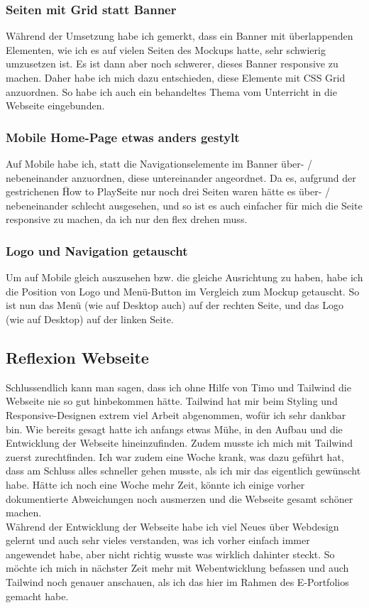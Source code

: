 \documentclass[11pt]{article}
\begin{document}
    \subsubsection{Seiten mit Grid statt Banner}
    Während der Umsetzung habe ich gemerkt, dass ein Banner mit überlappenden Elementen, wie ich es auf vielen Seiten des Mockups hatte, sehr
    schwierig umzusetzen ist. Es ist dann aber noch schwerer, dieses Banner responsive zu machen. Daher habe ich mich dazu entschieden,
    diese Elemente mit CSS Grid anzuordnen. So habe ich auch ein behandeltes Thema vom Unterricht in die Webseite eingebunden.

    \subsubsection{Mobile Home-Page etwas anders gestylt}
    Auf Mobile habe ich, statt die Navigationselemente im Banner über- / nebeneinander anzuordnen, diese untereinander angeordnet. Da es, aufgrund
    der gestrichenen \"How to Play\" Seite nur noch drei Seiten waren hätte es über- / nebeneinander schlecht ausgesehen, und so ist es auch
    einfacher für mich die Seite responsive zu machen, da ich nur den flex drehen muss.

    \subsubsection{Logo und Navigation getauscht}
    Um auf Mobile gleich auszusehen bzw. die gleiche Ausrichtung zu haben, habe ich die Position von Logo und Menü-Button im Vergleich zum Mockup
    getauscht. So ist nun das Menü (wie auf Desktop auch) auf der rechten Seite, und das Logo (wie auf Desktop) auf der linken Seite.

    \subsection{Reflexion Webseite}
    Schlussendlich kann man sagen, dass ich ohne Hilfe von Timo und Tailwind die Webseite nie so gut hinbekommen hätte. Tailwind hat mir
    beim Styling und Responsive-Designen extrem viel Arbeit abgenommen, wofür ich sehr dankbar bin. Wie bereits gesagt hatte ich anfangs etwas
    Mühe, in den Aufbau und die Entwicklung der Webseite hineinzufinden. Zudem musste ich mich mit Tailwind zuerst zurechtfinden. Ich war zudem
    eine Woche krank, was dazu geführt hat, dass am Schluss alles schneller gehen musste, als ich mir das eigentlich gewünscht habe. Hätte ich noch
    eine Woche mehr Zeit, könnte ich einige vorher dokumentierte Abweichungen noch ausmerzen und die Webseite gesamt schöner machen.\\
    Während der Entwicklung der Webseite habe ich viel Neues über Webdesign gelernt und auch sehr vieles verstanden, was ich vorher einfach
    immer angewendet habe, aber nicht richtig wusste was wirklich dahinter steckt. So möchte ich mich in nächster Zeit mehr mit Webentwicklung
    befassen und auch Tailwind noch genauer anschauen, als ich das hier im Rahmen des E-Portfolios gemacht habe.
\end{document}
